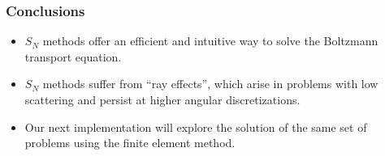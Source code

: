 \begin{frame}
      \frametitle{Conclusions}
      \begin{itemize}
            \item $S_N$ methods offer an efficient and intuitive way to solve the Boltzmann transport
                  equation.
            \item $S_N$ methods suffer from ``ray effects'', which arise in problems with low scattering and persist at higher angular discretizations.
            \item Our next implementation will explore the solution of the same set of problems using the finite element method.
      \end{itemize}
\end{frame}
